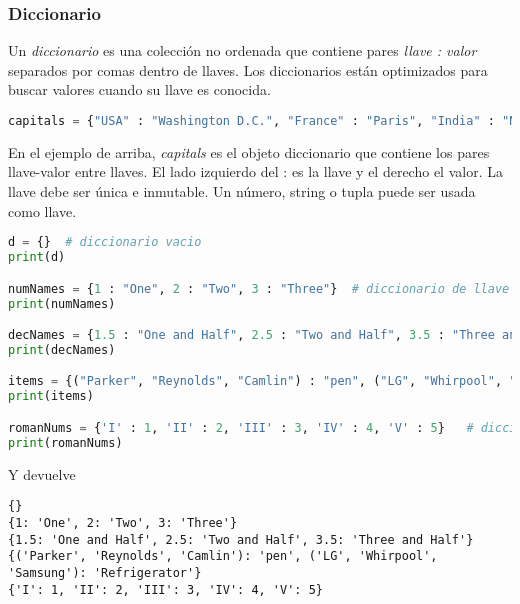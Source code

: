     \subsubsection{Diccionario}\label{subsubsec: diccionario}
    Un \emph{diccionario} es una colección no ordenada que contiene pares \emph{llave : valor} separados por comas dentro de llaves.
    Los diccionarios están optimizados para buscar valores cuando su llave es conocida.
    \begin{lstlisting}[language = {python}]
capitals = {"USA" : "Washington D.C.", "France" : "Paris", "India" : "New Delhi"}
    \end{lstlisting}
    En el ejemplo de arriba, \emph{capitals} es el objeto diccionario que contiene los pares llave-valor entre llaves. El lado izquierdo del : es la llave y el derecho el valor. La llave debe ser única e inmutable. Un número, string o tupla puede ser usada como llave.
    \begin{lstlisting}[language = {python}]
d = {}  # diccionario vacio
print(d)

numNames = {1 : "One", 2 : "Two", 3 : "Three"}  # diccionario de llave entera y valores string
print(numNames)

decNames = {1.5 : "One and Half", 2.5 : "Two and Half", 3.5 : "Three and Half"}  # diccionario de llave float y valores string
print(decNames)

items = {("Parker", "Reynolds", "Camlin") : "pen", ("LG", "Whirpool", "Samsung") : "Refrigerator"} # diccionario de llave tupla y valores string
print(items)

romanNums = {'I' : 1, 'II' : 2, 'III' : 3, 'IV' : 4, 'V' : 5}   # diccionario de llave string y valores enteros
print(romanNums)
    \end{lstlisting}
    Y devuelve
    \begin{lstlisting}[language = {[latex]tex}]
{}
{1: 'One', 2: 'Two', 3: 'Three'}
{1.5: 'One and Half', 2.5: 'Two and Half', 3.5: 'Three and Half'}
{('Parker', 'Reynolds', 'Camlin'): 'pen', ('LG', 'Whirpool', 'Samsung'): 'Refrigerator'}
{'I': 1, 'II': 2, 'III': 3, 'IV': 4, 'V': 5}
    \end{lstlisting}
